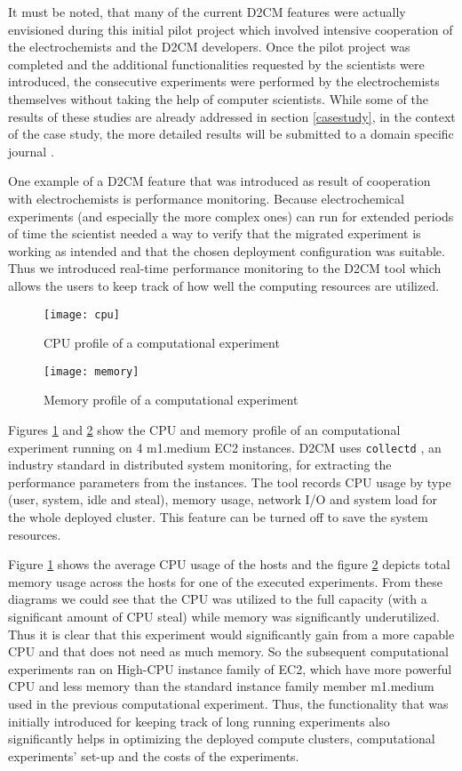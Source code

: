 \documentclass[a4paper,10pt]{article}
\begin{document}
It must be noted, that many of the current D2CM features were actually envisioned during this initial pilot project which involved intensive cooperation of the electrochemists and the D2CM developers. Once the pilot project was completed and the additional functionalities requested by the scientists were introduced, the consecutive experiments were performed by the electrochemists themselves without taking the help of computer scientists. While some of the results of these studies are already addressed in section \ref{casestudy}, in the context of the case study, the more detailed results will be submitted to a domain specific journal \cite{ivanistsev2012}.

One example of a D2CM feature that was introduced as result of cooperation with electrochemists is performance monitoring. Because electrochemical experiments (and especially the more complex ones) can run for extended periods of time the scientist needed a way to verify that the migrated experiment is working as intended and that the chosen deployment configuration was suitable. Thus we introduced real-time performance monitoring to the D2CM tool which allows the users to keep track of how well the computing resources are utilized. 

\begin{figure}
\centering
\texttt{[image: cpu]}
\caption{CPU profile of a computational experiment}
\label{fig:CPUProfile}
\end{figure}

\begin{figure}
\centering
\texttt{[image: memory]}
\caption{Memory profile of a computational experiment}
\label{fig:MemProfile}
\end{figure}


Figures \ref{fig:CPUProfile} and \ref{fig:MemProfile} show the CPU and memory profile of an computational experiment running on 4 m1.medium EC2 instances. D2CM uses \texttt{collectd} \cite{collectd}, an industry standard in distributed system monitoring, for extracting the performance parameters from the instances.  The tool records CPU usage by type (user, system, idle and steal), memory usage, network I/O and system load for the whole deployed cluster. This feature can be turned off to save the system resources.

Figure \ref{fig:CPUProfile} shows the average CPU usage of the hosts and the figure \ref{fig:MemProfile} depicts total memory usage across the hosts for one of the executed experiments. From these diagrams we could see that the CPU was utilized to the full capacity (with a significant amount of CPU steal) while memory was significantly underutilized. Thus it is clear that this experiment would significantly gain from a more capable CPU and that does not need as much memory. So the subsequent computational experiments ran on High-CPU instance family of EC2, which have more powerful CPU and less memory than the standard instance family member m1.medium used in the previous computational experiment. Thus, the functionality that was initially introduced for keeping track of long running experiments also significantly helps in optimizing the deployed compute clusters, computational experiments' set-up and the costs of the experiments. 
\end{document}
